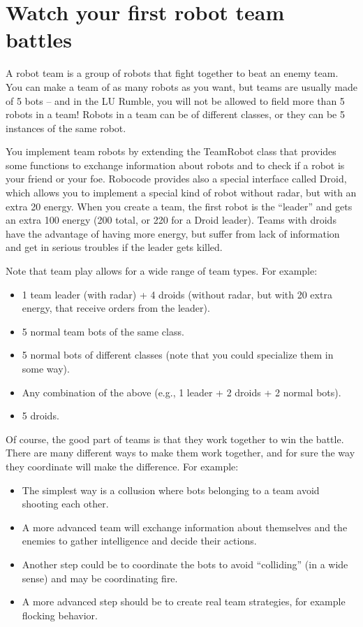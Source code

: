 \documentclass{scrreprt}
\begin{document}
\section{Watch your first robot team battles} \label{sec:team}
A robot team is a group of robots that fight together to beat an enemy team. You can make a team of as many robots as you want, but teams are usually made of 5 bots -- and in the LU Rumble, you will not be allowed to field more than 5 robots in a team! Robots in a team can be of different classes, or they can be 5 instances of the same robot.

You implement team robots by extending the TeamRobot class that provides some functions to exchange information about robots and to check if a robot is your friend or your foe. Robocode provides also a special interface called Droid, which allows you to implement a special kind of robot without radar, but with an extra 20 energy. When you create a team, the first robot is the ``leader'' and gets an extra 100 energy (200 total, or 220 for a Droid leader). Teams with droids have the advantage of having more energy, but suffer from lack of information and get in serious troubles if the leader gets killed.

Note that team play allows for a wide range of team types. For example:
\begin{itemize}
\item 1 team leader (with radar) + 4 droids (without radar, but with 20 extra energy, that receive orders from the leader).
\item 5 normal team bots of the same class.
\item 5 normal bots of different classes (note that you could specialize them in some way).
\item Any combination of the above (e.g., 1 leader + 2 droids + 2 normal bots).
\item 5 droids. 
\end{itemize}

Of course, the good part of teams is that they work together to win the battle. There are many different ways to make them work together, and for sure the way they coordinate will make the difference. For example:

\begin{itemize}
\item The simplest way is a collusion where bots belonging to a team avoid shooting each other.
\item A more advanced team will exchange information about themselves and the enemies to gather intelligence and decide their actions.
\item Another step could be to coordinate the bots to avoid ``colliding'' (in a wide sense) and may be coordinating fire.
\item A more advanced step should be to create real team strategies, for example flocking behavior. 
\end{itemize}
    
\end{document}
